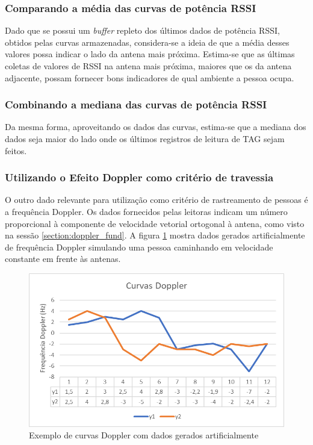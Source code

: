 \subsubsection{Comparando a média das curvas de potência RSSI} \label{section:mean_met}

 Dado que se possui um \textit{buffer} repleto dos últimos dados de potência RSSI, obtidos pelas curvas armazenadas, considera-se a ideia de que a média desses valores possa indicar o lado da antena mais próxima. Estima-se que as últimas coletas de valores de RSSI na antena mais próxima, maiores que os da antena adjacente, possam fornecer bons indicadores de qual ambiente a pessoa ocupa.



\subsubsection{Combinando a mediana das curvas de potência RSSI} \label{section:median_met}
 
 Da mesma forma, aproveitando os dados das curvas, estima-se que a mediana dos dados seja maior do lado onde os últimos registros de leitura de TAG sejam feitos.

 

 \subsubsection{Utilizando o Efeito Doppler como critério de travessia} \label{section:doppler_met}
 
  O outro dado relevante para utilização como critério de rastreamento de pessoas é a frequência Doppler. Os dados fornecidos pelas leitoras indicam um número proporcional à componente de velocidade vetorial ortogonal à antena, como visto na sessão \ref{section:doppler_fund}. A figura \ref{fig:doppler_MET} mostra dados gerados artificialmente de frequência Doppler simulando uma pessoa caminhando em velocidade constante em frente às antenas.
 
   \begin{figure}[H]
    \centering
    \includegraphics[width=0.8\linewidth]{figs/Metodologia/image003.png}
    \caption{Exemplo de curvas Doppler com dados gerados artificialmente}
    \label{fig:doppler_MET}
\end{figure}

